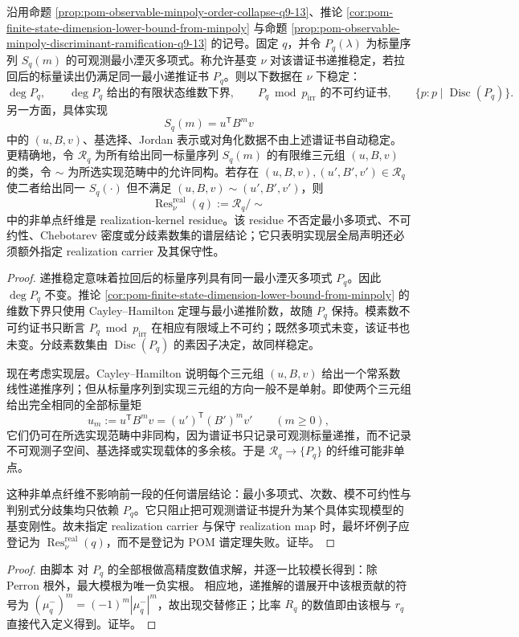 \begin{proposition}[可观测最小多项式证书的相对稳定性与实现核残差]\label{distill:grothendieck-relative_certificate_base_change_stability-pom-minpoly-realization-residue}
沿用命题 \ref{prop:pom-observable-minpoly-order-collapse-q9-13}、推论 \ref{cor:pom-finite-state-dimension-lower-bound-from-minpoly} 与命题 \ref{prop:pom-observable-minpoly-discriminant-ramification-q9-13} 的记号。固定 \(q\)，并令 \(P_q(\lambda)\) 为标量序列 \(S_q(m)\) 的可观测最小湮灭多项式。称允许基变 \(\nu\) 对该谱证书递推稳定，若拉回后的标量读出仍满足同一最小递推证书 \(P_q\)。则以下数据在 \(\nu\) 下稳定：
\[
\deg P_q,\qquad
\deg P_q\text{ 给出的有限状态维数下界},\qquad
P_q\bmod p_{\mathrm{irr}}\text{ 的不可约证书},\qquad
\{p:p\mid\operatorname{Disc}(P_q)\}.
\]
另一方面，具体实现
\[
S_q(m)=u^{\mathsf T}B^m v
\]
中的 \((u,B,v)\)、基选择、Jordan 表示或对角化数据不由上述谱证书自动稳定。更精确地，令 \(\mathcal R_q\) 为所有给出同一标量序列 \(S_q(m)\) 的有限维三元组 \((u,B,v)\) 的类，令 \(\sim\) 为所选实现范畴中的允许同构。若存在 \((u,B,v),(u',B',v')\in\mathcal R_q\) 使二者给出同一 \(S_q(\cdot)\) 但不满足 \((u,B,v)\sim(u',B',v')\)，则
\[
\operatorname{Res}^{\mathrm{real}}_\nu(q):=\mathcal R_q/\!\sim
\]
中的非单点纤维是 realization-kernel residue。该 residue 不否定最小多项式、不可约性、Chebotarev 密度或分歧素数集的谱层结论；它只表明实现层全局声明还必须额外指定 realization carrier 及其保守性。
\end{proposition}
\begin{proof}
递推稳定意味着拉回后的标量序列具有同一最小湮灭多项式 \(P_q\)。因此 \(\deg P_q\) 不变。推论 \ref{cor:pom-finite-state-dimension-lower-bound-from-minpoly} 的维数下界只使用 Cayley--Hamilton 定理与最小递推阶数，故随 \(P_q\) 保持。模素数不可约证书只断言 \(P_q\bmod p_{\mathrm{irr}}\) 在相应有限域上不可约；既然多项式未变，该证书也未变。分歧素数集由 \(\operatorname{Disc}(P_q)\) 的素因子决定，故同样稳定。

现在考虑实现层。Cayley--Hamilton 说明每个三元组 \((u,B,v)\) 给出一个常系数线性递推序列；但从标量序列到实现三元组的方向一般不是单射。即使两个三元组给出完全相同的全部标量矩
\[
u_m:=u^{\mathsf T}B^m v=(u')^{\mathsf T}(B')^m v'\qquad(m\ge0),
\]
它们仍可在所选实现范畴中非同构，因为谱证书只记录可观测标量递推，而不记录不可观测子空间、基选择或实现载体的多余核。于是 \(\mathcal R_q\to\{P_q\}\) 的纤维可能非单点。

这种非单点纤维不影响前一段的任何谱层结论：最小多项式、次数、模不可约性与判别式分歧集均只依赖 \(P_q\)。它只阻止把可观测谱证书提升为某个具体实现模型的基变刚性。故未指定 realization carrier 与保守 realization map 时，最坏坏例子应登记为 \(\operatorname{Res}^{\mathrm{real}}_\nu(q)\)，而不是登记为 POM 谱定理失败。证毕。
\end{proof}


\begin{proof}
由脚本  对 \(P_q\) 的全部根做高精度数值求解，并逐一比较模长得到：除 Perron 根外，最大模根为唯一负实根。
相应地，递推解的谱展开中该根贡献的符号为 \((\mu^-_q)^m=(-1)^m|\mu^-_q|^m\)，故出现交替修正；比率 \(R_q\) 的数值即由该根与 \(r_q\) 直接代入定义得到。证毕。
\end{proof}

